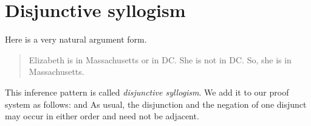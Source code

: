 %

\section{Disjunctive syllogism}
Here is a very natural argument form.
	\begin{quote}
		Elizabeth is in Massachusetts or in DC. She is not in DC. So, she is in Massachusetts.
	\end{quote}
This inference pattern is called \emph{disjunctive syllogism}. We add it to our proof system as follows:
and
As usual, the disjunction and the negation of one disjunct may occur in either order and need not be adjacent. 

